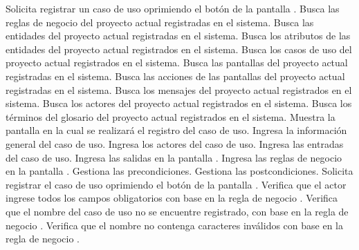  \begin{UCtrayectoria}
    \UCpaso[\UCactor] Solicita registrar un caso de uso oprimiendo el botón  de la pantalla .
    \UCpaso[\UCsist] Busca las reglas de negocio del proyecto actual registradas en el sistema. 
    \UCpaso[\UCsist] Busca las entidades del proyecto actual registradas en el sistema. 
    \UCpaso[\UCsist] Busca los atributos de las entidades del proyecto actual registrados en el sistema. 
    \UCpaso[\UCsist] Busca los casos de uso del proyecto actual registrados en el sistema. 
    \UCpaso[\UCsist] Busca las pantallas del proyecto actual registradas en el sistema. 
    \UCpaso[\UCsist] Busca las acciones de las pantallas del proyecto actual registradas en el sistema. 
    \UCpaso[\UCsist] Busca los mensajes del proyecto actual registrados en el sistema. 
    \UCpaso[\UCsist] Busca los actores del proyecto actual registrados en el sistema. 
    \UCpaso[\UCsist] Busca los términos del glosario del proyecto actual registrados en el sistema. 
    \UCpaso[\UCsist] Muestra la pantalla  en la cual se realizará el registro del caso de uso. 
    \UCpaso[\UCactor] Ingresa la información general del caso de uso. \label{cu5.1:ingresaDatos}
    \UCpaso[\UCactor] Ingresa los actores del caso de uso.  \label{cu5.1:ingresaActores}
    \UCpaso[\UCactor] Ingresa las entradas del caso de uso.   \label{cu5.1:ingresaEntradas}
    \UCpaso[\UCactor] Ingresa las salidas en la pantalla .    \label{cu5.1:ingresaSalidas}
    \UCpaso[\UCactor] Ingresa las reglas de negocio en la pantalla .  \label{cu5.1:ingresaReglasNegocio}
	\UCpaso[\UCactor] Gestiona las precondiciones.\label{cu5.1:ingresaPrecond}
    \UCpaso[\UCactor] Gestiona las postcondiciones.\label{cu5.1:ingresaPostcond}
    \UCpaso[\UCactor] Solicita registrar el caso de uso oprimiendo el botón  de la pantalla . 
    \UCpaso[\UCsist] Verifica que el actor ingrese todos los campos obligatorios con base en la regla de negocio  . 
	\UCpaso[\UCsist] Verifica que el nombre del caso de uso no se encuentre registrado, con base en la regla de negocio  . 
    \UCpaso[\UCsist] Verifica que el nombre no contenga caracteres inválidos con base en la regla de negocio . 

\end{UCtrayectoria}
